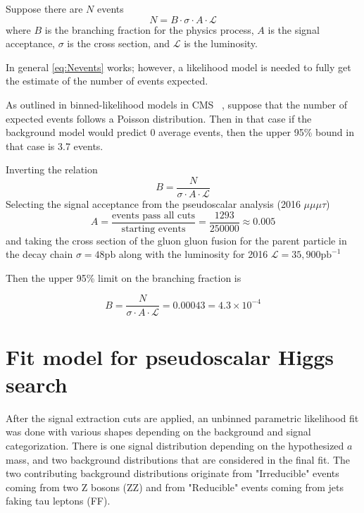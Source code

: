 Suppose there are $N$ events 
\begin{equation}
\label{eq:Nevents}
N = B\cdot \sigma \cdot A\cdot \mathcal{L}
\end{equation}
where $B$ is the branching fraction for the physics process, $A$ is the signal acceptance, $\sigma$ is the cross section, and $\mathcal{L}$ is the luminosity.


In general \ref{eq:Nevents} works; however, a likelihood model is needed to fully get the estimate of the number of events expected. 

As outlined in binned-likelihood models in CMS ~\cite{Cowan_2011}, suppose that the number of expected events follows a Poisson distribution. Then in that case if the background model would predict 0 average events, then the upper 95\% bound in that case is 3.7 events. 

Inverting the relation
\[B = \frac{N}{\sigma \cdot A\cdot \mathcal{L}}\]
Selecting the signal acceptance from the pseudoscalar analysis (2016 $\mu\mu\mu\tau$) 
\[ A = \frac{\text{events pass all cuts}}{\text{starting events}} = \frac{1293}{250000} \approx 0.005 \]
and taking the cross section of the gluon gluon fusion for the parent particle in the decay chain $\sigma = 48 \text{pb}$ along with the luminosity for 2016 $\mathcal{L} = 35,900 \text{pb}^{-1}$

Then the upper 95\% limit on the branching fraction is 

\[B =  \frac{N}{\sigma \cdot A\cdot \mathcal{L}} = 0.00043 = 4.3 \times 10^{-4}\]



\section{Fit model for pseudoscalar Higgs search}
After the signal extraction cuts are applied, an unbinned parametric likelihood fit was done with various shapes depending on the background and signal categorization. There is one signal distribution depending on the hypothesized $a$ mass, and two background distributions that are considered in the final fit. The two contributing background distributions originate from "Irreducible" events coming from two Z bosons (ZZ) and from "Reducible" events coming from jets faking tau leptons (FF).  


